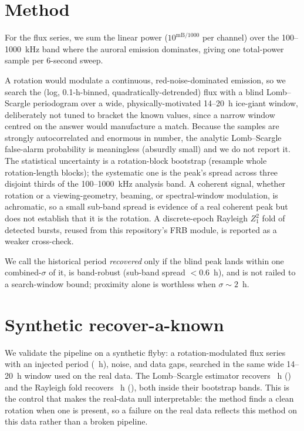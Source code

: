 \documentclass[twocolumn]{aastex631}
\begin{document}
\section{Method}
\label{sec:method}
For the flux series, we sum the linear power ($10^{\mathrm{mB}/1000}$ per channel) over the
100--1000~kHz band where the auroral emission dominates, giving one total-power sample per 6-second
sweep.

A rotation would modulate a continuous, red-noise-dominated emission, so
we search the (log, 0.1-h-binned, quadratically-detrended) flux with a blind Lomb--Scargle
periodogram over
a wide, physically-motivated 14--20~h ice-giant window, deliberately not tuned to bracket
the known values, since a narrow window centred on the answer would manufacture a match. Because the
samples are strongly autocorrelated and enormous in number, the analytic Lomb--Scargle false-alarm
probability is meaningless (absurdly small) and we do not report it. The statistical
uncertainty is a rotation-block bootstrap (resample whole rotation-length blocks); the systematic
one is the peak's spread across three disjoint thirds of the 100--1000~kHz analysis band. A coherent signal, whether rotation or a
viewing-geometry, beaming, or spectral-window modulation, is achromatic, so a small sub-band spread
is evidence of a real coherent peak but does not establish that it is the rotation. A discrete-epoch
Rayleigh $Z^2_1$ fold \citep{buccheri1983} of detected bursts, reused from this repository's FRB
module, is reported as a weaker cross-check.

We call the historical period \emph{recovered} only if the blind peak lands within one
combined-$\sigma$ of it, is band-robust (sub-band spread $<0.6$~h), and is not railed to a
search-window bound; proximity alone is worthless when $\sigma\sim2$~h.

\section{Synthetic recover-a-known}
We validate the pipeline on a synthetic flyby: a rotation-modulated flux series with an injected
period (\vgSynInjected~h), noise, and data gaps, searched in the same wide 14--20~h window
used on the real data. The Lomb--Scargle estimator recovers \vgSynRecovered~h (\vgSynRecoveredOK) and
the Rayleigh fold recovers \vgSynRayPeriod~h (\vgSynRayOK), both inside their bootstrap bands. This is
the control that makes the real-data null interpretable: the method finds a clean rotation when one is
present, so a failure on the real data reflects this method on this data rather than a broken
pipeline.
\end{document}
